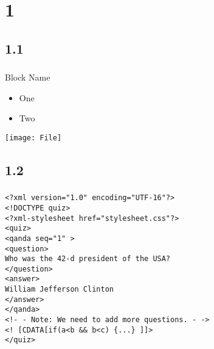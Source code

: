 \documentclass[t,pdf,hyperref={unicode}]{beamer} %
\title{}
\subtitle{}
\author{}
\date{}
\institute[University]{}
\begin{document}
\frame[plain]{\titlepage}

\section{1}
\subsection{1.1}

\begin{frame}[c]
	\frametitle{\insertsection} 
	\framesubtitle{\insertsubsection}
	\begin{block}{Block Name}
		\begin{itemize}
			\item One\pause
			\item Two
		\end{itemize}
	\end{block}
	\texttt{[image: File]}
	\end{frame}

\subsection{1.2}
 
\begin{frame}[fragile]
	\frametitle{\insertsection} 
	\framesubtitle{\insertsubsection}
	\alert<1>{\alert<5>{\texttt{<?xml version="1.0"\ \!encoding="UTF-16"?>}}\\
	\alert<6>{\texttt{<!DOCTYPE quiz>}}\\
	\alert<7>{\texttt{<?xml-stylesheet href="stylesheet.css"?>}}\\}
	\alert<2>{\texttt{<quiz>}\\
	\alert<3>{\texttt{\quad<qanda seq="1"\!\,>}\\
	\texttt{\quad\quad<question>}\\
	\texttt{\quad\quad\quad Who was the 42-d president of the USA?}\\
	\texttt{\quad\quad</question>}\\
	\texttt{\quad\quad<answer>}\\
	\texttt{\quad\quad\quad William Jefferson Clinton}\\
	\texttt{\quad\quad</answer>}\\
	\texttt{\quad</qanda>}}\\
	\alert<4>{\texttt{\quad<!-\,\!- Note: We need to add more questions. -\,\!->}}\\
	\alert<8>{\texttt{<!\ [CDATA[if(a<b \&\& b<c) \{...\}\ ]]>}}\\
	\texttt{</quiz>}}	
\end{frame}
\end{document}

